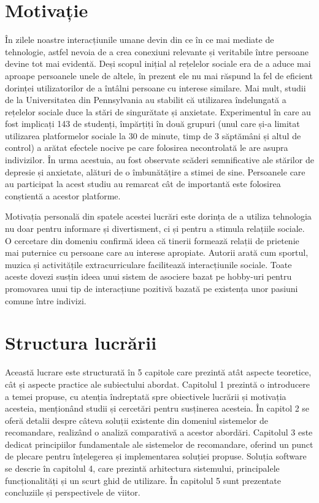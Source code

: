 \section{Motivație}
\label{section:ch1sec2}
În zilele noastre interacțiunile umane devin din ce în ce mai mediate de tehnologie, astfel nevoia de a crea conexiuni relevante și veritabile între persoane devine tot mai evidentă.
Deși scopul inițial al rețelelor sociale era de a aduce mai aproape persoanele unele de altele, în prezent ele nu mai răspund la fel de eficient dorinței utilizatorilor de a întâlni persoane cu interese similare.
Mai mult, studii de la Universitatea din Pennsylvania \cite{hunt2018no} au stabilit că utilizarea îndelungată a rețelelor sociale duce la stări de singurătate și anxietate.
Experimentul în care au fost implicați 143 de studenți, împărțiți în două grupuri (unul care și-a limitat utilizarea platformelor sociale la 30 de minute, timp de 3 săptămâni și altul de control) a arătat efectele nocive pe care folosirea necontrolată le are asupra indivizilor.
În urma acestuia, au fost observate scăderi semnificative ale stărilor de depresie și anxietate, alături de o îmbunătățire a stimei de sine.
Persoanele care au participat la acest studiu au remarcat cât de importantă este folosirea conștientă a acestor platforme.
\par
Motivația personală din spatele acestei lucrări este dorința de a utiliza tehnologia nu doar pentru informare și divertisment, ci și pentru a stimula relațiile sociale.
O cercetare din domeniu \cite{xiao2018common} confirmă ideea că tinerii formează relații de prietenie mai puternice cu persoane care au interese apropiate.
Autorii arată cum sportul, muzica și activitățile extracurriculare facilitează interacțiunile sociale.
Toate aceste dovezi susțin ideea unui sistem de asociere bazat pe hobby-uri pentru promovarea unui tip de interacțiune pozitivă bazată pe existența unor pasiuni comune între indivizi.

\section{Structura lucrării}
\label{section:ch1sec3}

Această lucrare este structurată în 5 capitole care prezintă atât aspecte teoretice, cât și aspecte practice ale subiectului abordat. 
Capitolul 1 prezintă o introducere a temei propuse, cu atenția îndreptată spre obiectivele lucrării și motivația acesteia, menționând studii și cercetări pentru susținerea acesteia.
În capitol 2 se oferă detalii despre câteva soluții existente din domeniul sistemelor de recomandare, realizând o analiză comparativă a acestor abordări.
Capitolul 3 este dedicat principiilor fundamentale ale sistemelor de recomandare, oferind un punct de plecare pentru înțelegerea și implementarea soluției propuse.
Soluția software se descrie în capitolul 4, care prezintă arhitectura sistemului, principalele funcționalități și un scurt ghid de utilizare.
În capitolul 5 sunt prezentate concluziile și perspectivele de viitor.

